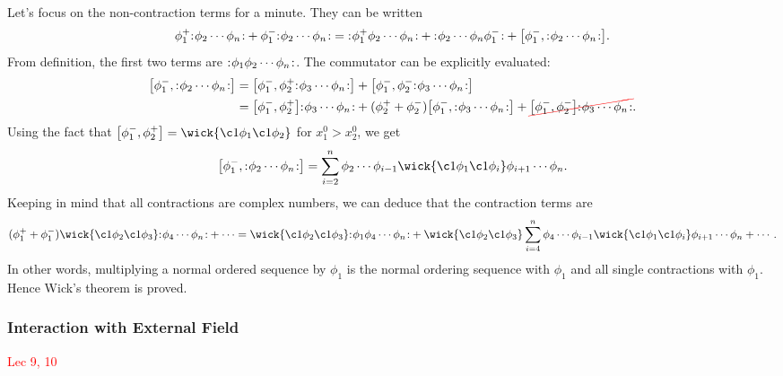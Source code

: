 \documentclass{article}
\begin{document}
Let's focus on the non-contraction terms for a minute. They can be written 
$$\phi^+_1\normord{\phi_2\cdots\phi_n}+\phi^-_1\normord{\phi_2\cdots\phi_n}=\normord{\phi^+_1\phi_2\cdots\phi_n}+\normord{\phi_2\cdots\phi_n\phi^-_1}+\comm{\phi^-_1}{\normord{\phi_2\cdots\phi_n}}.$$
From definition, the first two terms are ${:}\mkern1mu\phi_1\phi_2\cdots\phi_n\mkern1.6mu{:}$. The commutator can be explicitly evaluated:
\begin{align*}
    \comm{\phi^-_1}{\normord{\phi_2\cdots\phi_n}}&=\comm{\phi^-_1}{\phi^+_2\normord{\phi_3\cdots\phi_n}}+\comm{\phi^-_1}{\phi^-_2\normord{\phi_3\cdots\phi_n}}\\
    &=\comm{\phi^-_1}{\phi^+_2}\normord{\phi_3\cdots\phi_n}+(\phi^+_2+\phi^-_2)\comm{\phi^-_1}{\normord{\phi_3\cdots\phi_n}}+\Ccancel[red]{\comm{\phi^-_1}{\phi^-_2}\normord{\phi_3\cdots\phi_n}}.
\end{align*}
Using the fact that $\comm{\phi^-_1}{\phi^+_2}=\wick{\c1\phi_1\c1\phi_2}$ for $x^0_1>x^0_2$, we get 
$$\comm{\phi^-_1}{\normord{\phi_2\cdots\phi_n}}=\sum^n_{i=2}\phi_2\cdots\phi_{i-1}\wick{\c1\phi_1\c1\phi_i}\phi_{i+1}\cdots\phi_n.$$
Keeping in mind that all contractions are complex numbers, we can deduce that the contraction terms are 
$$(\phi^+_1+\phi^-_1)\wick{\c1\phi_2\c1\phi_3}\normord{\phi_4\cdots\phi_n}+\cdots=\wick{\c1\phi_2\c1\phi_3}\normord{\phi_1\phi_4\cdots\phi_n}+\wick{\c1\phi_2\c1\phi_3}\sum^n_{i=4}\phi_4\cdots\phi_{i-1}\wick{\c1\phi_1\c1\phi_i}\phi_{i+1}\cdots\phi_n+\cdots.$$
In other words, multiplying a normal ordered sequence by $\phi_1$ is the normal ordering sequence with $\phi_1$ and all single contractions with $\phi_1$. Hence Wick's theorem is proved.

\subsubsection{Interaction with External Field}
\textcolor{red}{Lec 9, 10}
\end{document}

